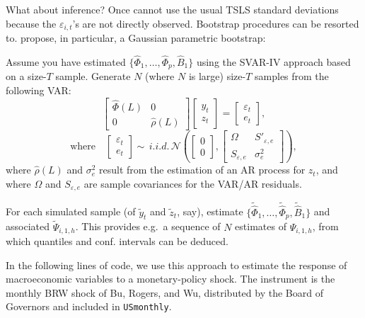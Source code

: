 \documentclass[
  11pt,
]{book}
\theoremstyle{definition}
\theoremstyle{definition}
\theoremstyle{definition}
\theoremstyle{definition}
\theoremstyle{remark}
\begin{document}
What about inference? Once cannot use the usual TSLS standard deviations because the \(\varepsilon_{i,t}\)'s are not directly observed. Bootstrap procedures can be resorted to. \citet{Stock_Watson_2018} propose, in particular, a Gaussian parametric bootstrap:

Assume you have estimated \(\{\widehat{\Phi}_1,\dots,\widehat{\Phi}_p,\widehat{B}_1\}\) using the SVAR-IV approach based on a size-\(T\) sample. Generate \(N\) (where \(N\) is large) size-\(T\) samples from the following VAR:
\[
\left[
\begin{array}{cc}
\widehat{\Phi}(L) & 0 \\
0 & \widehat{\rho}(L)
\end{array}
\right]
\left[
\begin{array}{c}
y_t \\
z_t
\end{array}
\right] =
\left[
\begin{array}{c}
\varepsilon_t \\
e_t
\end{array}
\right],
\]
\[
\mbox{where} \quad \left[
\begin{array}{c}
\varepsilon_t \\
e_t
\end{array}
\right]\sim \, i.i.d.\,\mathcal{N}\left(\left[\begin{array}{c}0\\0\end{array}\right],
\left[\begin{array}{cc}
\Omega & S'_{\varepsilon,e}\\
S_{\varepsilon,e}& \sigma^2_{e}
\end{array}\right]
\right),
\]
where \(\widehat{\rho}(L)\) and \(\sigma^2_{e}\) result from the estimation of an AR process for \(z_t\), and where \(\Omega\) and \(S_{\varepsilon,e}\) are sample covariances for the VAR/AR residuals.

For each simulated sample (of \(\tilde{y}_t\) and \(\tilde{z}_t\), say), estimate \(\{\widetilde{\widehat{\Phi}}_1,\dots,\widetilde{\widehat{\Phi}}_p,\widetilde{\widehat{B}}_1\}\) and associated \(\widetilde{\Psi}_{i,1,h}\). This provides e.g.~a sequence of \(N\) estimates of \(\Psi_{i,1,h}\), from which quantiles and conf. intervals can be deduced.

In the following lines of code, we use this approach to estimate the response of macroeconomic variables to a monetary-policy shock. The instrument is the monthly BRW shock of Bu, Rogers, and Wu, distributed by the Board of Governors and included in \texttt{USmonthly}.
\end{document}
